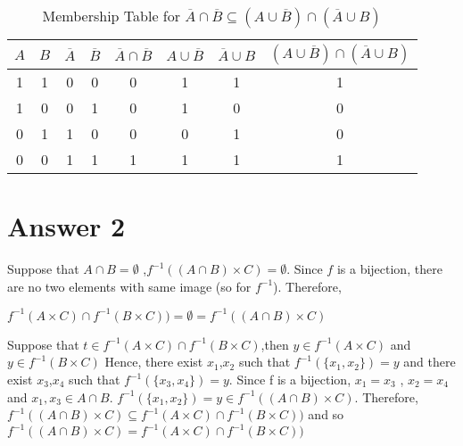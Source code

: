 \documentclass[12pt]{article}
\begin{document}
\begin{table}[H]

\small
\centering
\caption{ Membership Table for  $\overline{A} \cap \overline{B} \subseteq (A \cup \overline{B} )\cap (\overline{A} \cup B)$ }
\label{table:question 1/a}
\begin{tabular}{|c c|c c|c|c|c|c|}	%
\hline 	
			
\textbf{$A$} & \textbf{$B$} & \textbf{$\overline{A}$} & \textbf{$\overline{B}$} & \textbf{$\overline{A} \cap \overline{B}$} & \textbf{$A \cup \overline{B}$} & \textbf{$\overline{A }\cup B$} & \textbf{$(A \cup \overline{B})\cap(\overline{A }\cup B)  $}\\
\hline 
\hline 
1 & 1 & 0 & 0 & 0 & 1 & 1 & 1\\			%
1 & 0 & 0 & 1 & 0 & 1 & 0 & 0\\
0 & 1 & 1 & 0 & 0 & 0 & 1 & 0\\
0 & 0 & 1 & 1 & 1 & 1 & 1 & 1\\
\hline 

\end{tabular}

\end{table}




\section*{Answer 2}

\quad \quad Suppose that $A \cap B =  \emptyset$ ,$ f^{-1} ((A \cap B) \times C ) = \emptyset$. Since $f$ is a bijection, there are no two elements with same image (so for $f^{-1}$). Therefore,

\quad $ f^{-1} (A \times C) \cap f^{-1} (B \times C)) = \emptyset = f^{-1}((A\cap B) \times C)$
\vspace{10px}

\quad Suppose that $t \in f^{-1} (A \times C) \cap f^{-1} (B \times C) $,then $y \in f^{-1} (A \times C)$ and $y \in f^{-1}(B \times C)$
Hence, there exist $x_1$,$x_2$ such that $f^{-1} (\lbrace x_1,x_2 \rbrace) = y$ and there exist $x_3$,$x_4$ such that $f^{-1} (\lbrace x_3,x_4 \rbrace) = y$. Since f is a bijection, $x_1 = x_3$ , $x_2 = x_4$  and $x_1, x_3 \in A \cap B.$ $f^{-1} (\lbrace x_1,x_2 \rbrace) = y \in  f^{-1} ((A \cap B) \times C ) $. Therefore, $f^{-1} ((A \cap B) \times C ) \subseteq  f^{-1} (A \times C) \cap f^{-1} (B \times C)) $  and so\\$f^{-1} ((A \cap B) \times C ) =  f^{-1} (A \times C) \cap f^{-1} (B \times C)) $
\end{document}

